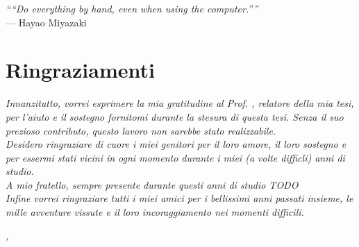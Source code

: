 \cleardoublepage
{}
{}

\begin{flushright}{
    \slshape
    ``“Do everything by hand, even when using the computer.”''} \\
    \medskip
    --- Hayao Miyazaki
\end{flushright}


\bigskip

\begingroup
\let\clearpage\relax
\let\cleardoublepage\relax
\let\cleardoublepage\relax

\chapter*{Ringraziamenti}

\noindent \textit{Innanzitutto, vorrei esprimere la mia gratitudine al Prof. \myProf, relatore della mia tesi, per l'aiuto e il sostegno fornitomi durante la stesura di questa tesi.
Senza il suo prezioso contributo, questo lavoro non sarebbe stato realizzabile.}\\

\noindent \textit{Desidero ringraziare di cuore i miei genitori per il loro amore, il loro sostegno e per essermi stati vicini in ogni momento durante i miei (a volte difficli) anni di studio.}\\

\noindent \textit{A mio fratello, sempre presente durante questi anni di studio TODO }\\

\noindent \textit{Infine vorrei ringraziare tutti i miei amici per i bellissimi anni passati insieme, le mille avventure vissute e il loro incoraggiamento nei momenti difficili.}\\
\bigskip

\noindent\textit{\myLocation, \myTime}
\hfill \myName

\endgroup
